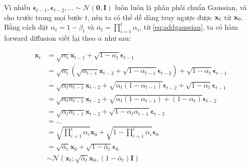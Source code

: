 Vì nhiễu $\boldsymbol{\epsilon}_{t-1}, \boldsymbol{\epsilon}_{t-2}, \dots \sim \mathcal{N}(\mathbf{0}, \mathbf{I})$ luôn luôn là phân phối chuẩn Gaussian, và cho trước trong mọi bước $t$, nên ta có thể dễ dàng truy ngược được $\mathbf{x}_t$ từ $\mathbf{x}_0$. Bằng cách đặt $\alpha_t = 1 - \beta_t$ và $\bar{\alpha}_t = \prod_{i=1}^t \alpha_i$, từ \autoref{eq:addgaussian}, ta có hàm forward diffusion viết lại theo $\alpha$ như sau:


\begin{equation}
\begin{aligned}
	\boldsymbol{x}_t &= \sqrt{\alpha_t}\boldsymbol{x}_{t-1} + \sqrt{1 - \alpha_t}\boldsymbol{\epsilon}_{t-1} \\
	&= \sqrt{\alpha_t}\left(\sqrt{\alpha_{t-1}}\boldsymbol{x}_{t-2} + \sqrt{1 - \alpha_{t-1}}\boldsymbol{\epsilon}_{t-2}\right) + \sqrt{1 - \alpha_t}\boldsymbol{\epsilon}_{t-1} \\
	&= \sqrt{\alpha_t\alpha_{t-1}}\boldsymbol{x}_{t-2} + \sqrt{\alpha_t(1 - \alpha_{t-1})}\boldsymbol{\epsilon}_{t-2} + \sqrt{1 - \alpha_t}\boldsymbol{\epsilon}_{t-1} \\
	&= \sqrt{\alpha_t\alpha_{t-1}}\boldsymbol{x}_{t-2} + \sqrt{\alpha_t(1 - \alpha_{t-1}) + (1 - \alpha_t)}\boldsymbol{\epsilon}_{t-2} \\
	&= \sqrt{\alpha_t\alpha_{t-1}}\boldsymbol{x}_{t-2} + \sqrt{1 - \alpha_t\alpha_{t-1}}\boldsymbol{\epsilon}_{t-2} \\
	&= \ldots \\
	&= \sqrt{\prod_{i=1}^t \alpha_i} \boldsymbol{x}_0 + \sqrt{1 - \prod_{i=1}^t \alpha_i} \boldsymbol{\epsilon}_0 \\
	&= \sqrt{\bar{\alpha}_t} \boldsymbol{x}_0 + \sqrt{1 - \bar{\alpha}_t} \boldsymbol{\epsilon}_0 \\
	&\sim \mathcal{N}\left(\boldsymbol{x}_t; \sqrt{\bar{\alpha}_t} \boldsymbol{x}_0, \left(1 - \bar{\alpha}_t\right) \textbf{I}\right)
\end{aligned}
\label{eq:tracexzero}
\end{equation}

